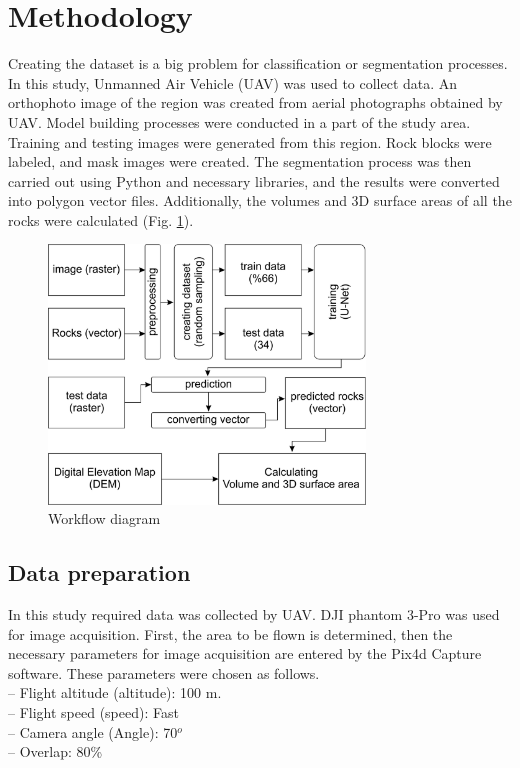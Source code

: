 \documentclass[a4paper,fleqn]{cas-sc}
\begin{document}
\section{Methodology}
Creating the dataset is a big problem for classification or segmentation processes. In this study, Unmanned Air Vehicle (UAV) was used to collect data. An orthophoto image of the region was created from aerial photographs obtained by UAV. Model building processes were conducted in a part of the study area. Training and testing images were generated from this region. Rock blocks were labeled, and mask images were created. The segmentation process was then carried out using Python and necessary libraries, and the results were converted into polygon vector files. Additionally, the volumes and 3D surface areas of all the rocks were calculated (Fig. \ref{fig:Figure3}).

\begin{figure}
	\centering
	\includegraphics[width=0.75\textwidth]{fig3.jpg}
	\caption{ Workflow diagram}
	\label{fig:Figure3}
\end{figure}
\subsection{Data preparation}
In this study required data was collected by UAV. DJI phantom 3-Pro was used for image acquisition. First, the area to be flown is determined, then the necessary parameters for image acquisition are entered by the Pix4d Capture software. These parameters were chosen as follows.\\
– Flight altitude (altitude): 100 m.\\
– Flight speed (speed): Fast\\
– Camera angle (Angle): 70$^o$\\
– Overlap: 80\%\\
\end{document}
